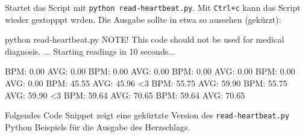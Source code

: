 \documentclass[
  11pt,
  a4paperpaper,
  oneside, openany  ,captions=tableheading
]{scrbook}
\newenvironment{Shaded}{\begin{snugshade}}{\end{snugshade}}
\newcommand{\ExtensionTok}[1]{\textcolor[rgb]{0.00,0.23,0.31}{#1}}
\newcommand{\NormalTok}[1]{\textcolor[rgb]{0.00,0.23,0.31}{#1}}
\newcommand{\OperatorTok}[1]{\textcolor[rgb]{0.37,0.37,0.37}{#1}}
\theoremstyle{definition}
\theoremstyle{remark}
\begin{document}
Startet das Script mit \texttt{python\ read-heartbeat.py}. Mit
\texttt{Ctrl+c} kann das Script wieder gestopppt wrden. Die Ausgabe
sollte in etwa so aussehen (gekürzt):

\begin{Shaded}
\begin{Highlighting}[]
\ExtensionTok{python}\NormalTok{ read{-}heartbeat.py }
\ExtensionTok{NOTE!}\NormalTok{ This code should not be used for medical diagnosis. }
\ExtensionTok{...}
\ExtensionTok{Starting}\NormalTok{ readings in 10 seconds...}

   \ExtensionTok{BPM:}\NormalTok{ 0.00  AVG: 0.00}
   \ExtensionTok{BPM:}\NormalTok{ 0.00  AVG: 0.00}
   \ExtensionTok{BPM:}\NormalTok{ 0.00  AVG: 0.00}
   \ExtensionTok{BPM:}\NormalTok{ 0.00  AVG: 0.00}
   \ExtensionTok{BPM:}\NormalTok{ 45.55  AVG: 45.96}
\OperatorTok{\textless{}}\NormalTok{3 }\ExtensionTok{BPM:}\NormalTok{ 55.75  AVG: 59.90}
   \ExtensionTok{BPM:}\NormalTok{ 55.75  AVG: 59.90}
\OperatorTok{\textless{}}\NormalTok{3 }\ExtensionTok{BPM:}\NormalTok{ 59.64  AVG: 70.65}
   \ExtensionTok{BPM:}\NormalTok{ 59.64  AVG: 70.65}
\end{Highlighting}
\end{Shaded}

Folgendes Code Snippet zeigt eine gekürtzte Version des
\texttt{read-heartbeat.py} Python Beispiels für die Ausgabe des
Herzschlags.
\end{document}
